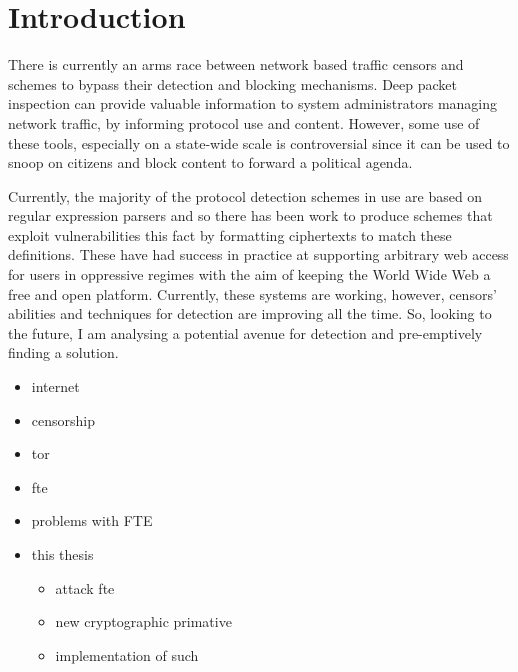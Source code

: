\documentclass[ %
                    author={Samuel Russell},
                supervisor={Prof. Bogdan Warinschi},
                    degree={MEng},
                     title={Innocuous Ciphertexts},
                  subtitle={The DE-CENSOR Scheme},
                      type={research},
                      year={2018} ]{dissertation}
\begin{document}
%

\mainmatter


\chapter{Introduction}
\label{chap:intro}

There is currently an arms race between network based traffic censors and schemes to bypass their detection and blocking mechanisms. 
Deep packet inspection can provide valuable information to system administrators managing network traffic, by informing protocol use and content.
However, some use of these tools, especially on a state-wide scale is controversial since it can be used to snoop on citizens and block content to forward a political agenda.

Currently, the majority of the protocol detection schemes in use are based on regular expression parsers and so there has been work to produce schemes that exploit vulnerabilities this fact by formatting ciphertexts to match these definitions.
These have had success in practice at supporting arbitrary web access for users in oppressive regimes with the aim of keeping the World Wide Web a free and open platform.
Currently, these systems are working, however, censors' abilities and techniques for detection are improving all the time. So, looking to the future, I am analysing a potential avenue for detection and pre-emptively finding a solution.

\begin{itemize}
\item internet
\item censorship
\item tor
\item fte
\item problems with FTE
\item this thesis
\begin{itemize}
\item attack fte
\item new cryptographic primative
\item implementation of such
\end{itemize}
\end{itemize}
\end{document}

